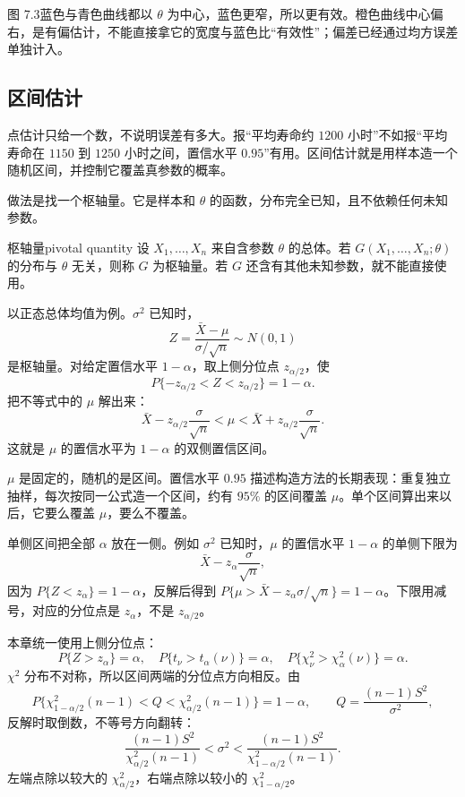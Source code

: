 {\small 图 7.3\quad 蓝色与青色曲线都以 $\theta$ 为中心，蓝色更窄，所以更有效。橙色曲线中心偏右，是有偏估计，不能直接拿它的宽度与蓝色比“有效性”；偏差已经通过均方误差单独计入。}

\subsection{区间估计}

点估计只给一个数，不说明误差有多大。报“平均寿命约 $1200$ 小时”不如报“平均寿命在 $1150$ 到 $1250$ 小时之间，置信水平 $0.95$”有用。区间估计就是用样本造一个随机区间，并控制它覆盖真参数的概率。

做法是找一个枢轴量。它是样本和 $\theta$ 的函数，分布完全已知，且不依赖任何未知参数。

\begin{mydef}{枢轴量}{pivotal quantity}
设 $X_1,\ldots,X_n$ 来自含参数 $\theta$ 的总体。若 $G(X_1,\ldots,X_n;\theta)$ 的分布与 $\theta$ 无关，则称 $G$ 为枢轴量。若 $G$ 还含有其他未知参数，就不能直接使用。
\end{mydef}

以正态总体均值为例。$\sigma^2$ 已知时，
\[
Z=\frac{\bar X-\mu}{\sigma/\sqrt n}\sim N(0,1)
\]
是枢轴量。对给定置信水平 $1-\alpha$，取上侧分位点 $z_{\alpha/2}$，使
\[
P\{-z_{\alpha/2}<Z<z_{\alpha/2}\}=1-\alpha.
\]
把不等式中的 $\mu$ 解出来：
\[
\bar X-z_{\alpha/2}\frac{\sigma}{\sqrt n}
<\mu<
\bar X+z_{\alpha/2}\frac{\sigma}{\sqrt n}.
\]
这就是 $\mu$ 的置信水平为 $1-\alpha$ 的双侧置信区间。

$\mu$ 是固定的，随机的是区间。置信水平 $0.95$ 描述构造方法的长期表现：重复独立抽样，每次按同一公式造一个区间，约有 $95\%$ 的区间覆盖 $\mu$。单个区间算出来以后，它要么覆盖 $\mu$，要么不覆盖。

单侧区间把全部 $\alpha$ 放在一侧。例如 $\sigma^2$ 已知时，$\mu$ 的置信水平 $1-\alpha$ 的单侧下限为
\[
\bar X-z_\alpha\frac{\sigma}{\sqrt n},
\]
因为 $P\{Z<z_\alpha\}=1-\alpha$，反解后得到 $P\{\mu>\bar X-z_\alpha\sigma/\sqrt n\}=1-\alpha$。下限用减号，对应的分位点是 $z_\alpha$，不是 $z_{\alpha/2}$。

本章统一使用上侧分位点：
\[
P\{Z>z_\alpha\}=\alpha,\quad
P\{t_\nu>t_\alpha(\nu)\}=\alpha,\quad
P\{\chi^2_\nu>\chi^2_\alpha(\nu)\}=\alpha.
\]
$\chi^2$ 分布不对称，所以区间两端的分位点方向相反。由
\[
P\{\chi^2_{1-\alpha/2}(n-1)<Q<\chi^2_{\alpha/2}(n-1)\}=1-\alpha,
\qquad Q=\frac{(n-1)S^2}{\sigma^2},
\]
反解时取倒数，不等号方向翻转：
\[
\frac{(n-1)S^2}{\chi^2_{\alpha/2}(n-1)}
<\sigma^2<
\frac{(n-1)S^2}{\chi^2_{1-\alpha/2}(n-1)}.
\]
左端点除以较大的 $\chi^2_{\alpha/2}$，右端点除以较小的 $\chi^2_{1-\alpha/2}$。

